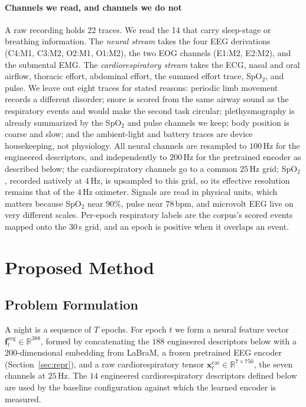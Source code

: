 \documentclass{ieeeaccess}
\begin{document}
\paragraph{Channels we read, and channels we do not}
A raw recording holds 22 traces. We read the 14 that carry sleep-stage or breathing
information. The \emph{neural stream} takes the four EEG derivations (C4:M1, C3:M2, O2:M1,
O1:M2), the two EOG channels (E1:M2, E2:M2), and the submental EMG. The
\emph{cardiorespiratory stream} takes the ECG, nasal and oral airflow, thoracic effort,
abdominal effort, the summed effort trace, SpO$_2$, and pulse. We leave out eight traces for
stated reasons: periodic limb movement records a different disorder; snore is scored from the
same airway sound as the respiratory events and would make the second task circular;
plethysmography is already summarized by the SpO$_2$ and pulse channels we keep; body position
is coarse and slow; and the ambient-light and battery traces are device housekeeping, not
physiology. All neural channels are resampled to $100$\,Hz for the engineered descriptors,
and independently to $200$\,Hz for the pretrained encoder as described below; the
cardiorespiratory channels go
to a common $25$\,Hz grid; SpO$_2$, recorded natively at $4$\,Hz, is upsampled to this grid, so
its effective resolution remains that of the $4$\,Hz oximeter. Signals are read in physical
units, which matters because SpO$_2$ near $90\%$,
pulse near $78$\,bpm, and microvolt EEG live on very different scales. Per-epoch respiratory
labels are the corpus's scored events mapped onto the $30$\,s grid, and an epoch is positive
when it overlaps an event.

\section{Proposed Method}
\label{sec:method}
\subsection{Problem Formulation}
A night is a sequence of $T$ epochs. For epoch $t$ we form a neural feature vector
$\mathbf{f}^{\mathrm{eeg}}_t\in\mathbb{R}^{388}$, formed by concatenating the $188$
engineered descriptors below with a $200$-dimensional embedding from LaBraM, a frozen
pretrained EEG encoder~\cite{labram2024} (Section~\ref{sec:repr}), and a raw cardiorespiratory tensor
$\mathbf{x}^{\mathrm{car}}_t\in\mathbb{R}^{7\times750}$, the seven channels at $25$\,Hz.
The $14$ engineered cardiorespiratory descriptors defined below are used by the baseline
configuration against which the learned encoder is measured.
\end{document}
